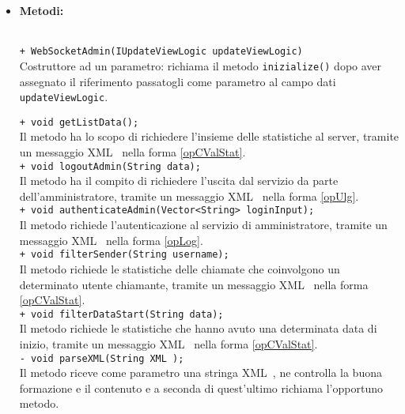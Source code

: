 {{\begin{sloppypar}
{{\begin{itemize}
{					\texttt{- Document a;}: il tipo Document serve a contenere e verificare la buona formazione della stringa XML\g~ inviata dal server\g.\\
					
					\texttt{- Vector<String> loginInput}: il vettore contiene i dati con i quali l'utente amministratore si è autenticato (o i dati con cui ha tentato di farlo).\\
				}
			
				\item[] \textbf{Metodi:}{ \\
					\texttt{+ WebSocketAdmin(IUpdateViewLogic updateViewLogic)}\\
					Costruttore ad un parametro: richiama il metodo \texttt{inizialize()} dopo aver assegnato il riferimento passatogli come parametro al campo dati \texttt{updateViewLogic}.
					
					\texttt{+ void getListData();}\\
					Il metodo ha lo scopo di richiedere l'insieme delle statistiche al server\g, tramite un messaggio XML\g~ nella forma \ref{opCValStat}.\\
					
					\texttt{+ void logoutAdmin(String data);}\\
					Il metodo ha il compito di richiedere l'uscita dal servizio da parte dell'amministratore, tramite un messaggio XML\g~ nella forma \ref{opUlg}.\\
					
					\texttt{+ void authenticateAdmin(Vector<String> loginInput);}\\
					Il metodo richiede l'autenticazione al servizio di amministratore, tramite un messaggio XML\g~ nella forma \ref{opLog}.\\
					
					\texttt{+ void filterSender(String username);}\\
					Il metodo richiede le statistiche delle chiamate che coinvolgono un determinato utente chiamante, tramite un messaggio XML\g~ nella forma \ref{opCValStat}.\\
					
					\texttt{+ void filterDataStart(String data);}\\
					Il metodo richiede le statistiche che hanno avuto una determinata data di inizio, tramite un messaggio XML\g~ nella forma \ref{opCValStat}.\\
					
					\texttt{- void parseXML(String XML\g~);}\\
					Il metodo riceve come parametro una stringa XML\g~, ne controlla la buona formazione e il contenuto e a seconda di quest'ultimo richiama l'opportuno metodo.\\
					
}
\end{itemize}}}
\end{sloppypar}}}

